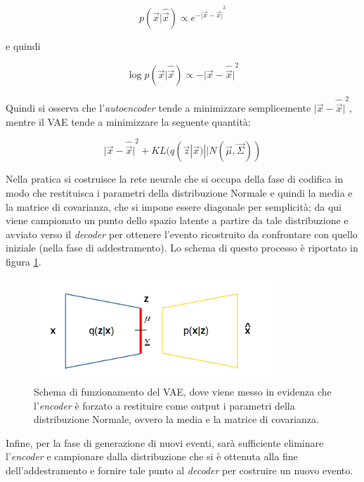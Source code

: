 \begin{equation}
	p(\vec{x}|\hat{\vec{x}}) \propto e^{{-{\lvert \vec{x}-\hat{\vec{x}}} \rvert}^2}
\end{equation}

e quindi

\begin{equation}
	\log p(\vec{x}|\hat{\vec{x}}) \propto -{\lvert \vec{x}-\hat{\vec{x}} \rvert}^2
\end{equation}

Quindi si osserva che l'\textit{autoencoder} tende a minimizzare semplicemente ${\lvert \vec{x}-\hat{\vec{x}} \rvert}^2$, mentre il VAE tende a minimizzare la seguente quantità:

\begin{equation}
	{\lvert \vec{x}-\hat{\vec{x}} \rvert}^2 + KL (q(\vec{z}|\vec{x})||N(\vec{\mu},\vec{\Sigma}))
\end{equation}

Nella pratica si costruisce la rete neurale che si occupa della fase di codifica in modo che restituisca i parametri della distribuzione Normale e quindi la media e la matrice di covarianza, che si impone essere diagonale per semplicità; da qui viene campionato un punto dello spazio latente a partire da tale distribuzione e avviato verso il \textit{decoder} per ottenere l'evento ricostruito da confrontare con quello iniziale (nella fase di addestramento). Lo schema di questo processo è riportato in figura \ref{schemaVAEs}.
\newpage

\begin{figure}[h!]
	\centering		\includegraphics[width=0.80\textwidth]{figs/VAEgauss.png}
	\caption{Schema di funzionamento del VAE, dove viene messo in evidenza che l'\textit{encoder} è forzato a restituire come output i parametri della distribuzione Normale, ovvero la media e la matrice di covarianza.}
	\label{schemaVAEs}
\end{figure}


Infine, per la fase di generazione di nuovi eventi, sarà sufficiente eliminare l'\textit{encoder} e campionare dalla distribuzione che si è ottenuta alla fine dell'addestramento e fornire tale punto al \textit{decoder} per costruire un nuovo evento.

\newpage